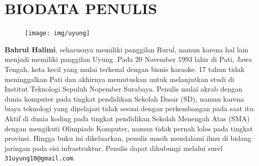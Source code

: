 \documentclass{ta-its}
\begin{document}
\backmatter %
	\chapter{BIODATA PENULIS}
		\begin{figure}
			\texttt{[image: img/uyung]}
		\end{figure}
		
		\textbf{Bahrul Halimi}, seharusnya memiliki panggilan Rurul, namun karena hal lain menjadi memiliki panggilan Uyung. Pada 20 November 1993 lahir di Pati, Jawa Tengah, kota kecil yang mulai terkenal dengan bisnis karaoke. 17 tahun tidak meninggalkan Pati dan akhirnya memutuskan untuk melanjutkan studi di Institut Teknologi Sepuluh Nopember Surabaya. Penulis mulai akrab dengan dunia komputer pada tingkat pendidikan Sekolah Dasar (SD), namun karena biaya teknologi yang dipelajari tidak sesuai dengan perkembangan pada saat itu. Aktif di dunia koding pada tingkat pendidikan Sekolah Menengah Atas (SMA) dengan mengikuti Olimpiade Komputer, namun tidak pernah lolos pada tingkat provinsi. Hingga buku ini dikeluarkan, penulis masih mendalami ilmu di bidang jaringan pada sisi infrastruktur. Penulis dapat dihubungi melalui surel \texttt{31uyung10@gmail.com}.
\end{document}
